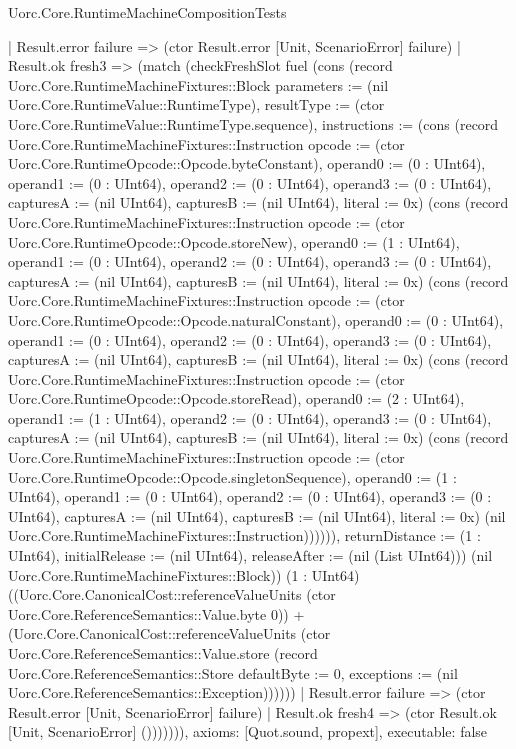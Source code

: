 \begin{lexlean}{Uorc.Core.RuntimeMachineCompositionTests}
\begin{semanticmodule}
{          | Result.error failure => (ctor Result.error [Unit, ScenarioError] failure)
          | Result.ok fresh3 => (match (checkFreshSlot fuel (cons (record Uorc.Core.RuntimeMachineFixtures::Block {parameters := (nil Uorc.Core.RuntimeValue::RuntimeType), resultType := (ctor Uorc.Core.RuntimeValue::RuntimeType.sequence), instructions := (cons (record Uorc.Core.RuntimeMachineFixtures::Instruction {opcode := (ctor Uorc.Core.RuntimeOpcode::Opcode.byteConstant), operand0 := (0 : UInt64), operand1 := (0 : UInt64), operand2 := (0 : UInt64), operand3 := (0 : UInt64), capturesA := (nil UInt64), capturesB := (nil UInt64), literal := 0x}) (cons (record Uorc.Core.RuntimeMachineFixtures::Instruction {opcode := (ctor Uorc.Core.RuntimeOpcode::Opcode.storeNew), operand0 := (1 : UInt64), operand1 := (0 : UInt64), operand2 := (0 : UInt64), operand3 := (0 : UInt64), capturesA := (nil UInt64), capturesB := (nil UInt64), literal := 0x}) (cons (record Uorc.Core.RuntimeMachineFixtures::Instruction {opcode := (ctor Uorc.Core.RuntimeOpcode::Opcode.naturalConstant), operand0 := (0 : UInt64), operand1 := (0 : UInt64), operand2 := (0 : UInt64), operand3 := (0 : UInt64), capturesA := (nil UInt64), capturesB := (nil UInt64), literal := 0x}) (cons (record Uorc.Core.RuntimeMachineFixtures::Instruction {opcode := (ctor Uorc.Core.RuntimeOpcode::Opcode.storeRead), operand0 := (2 : UInt64), operand1 := (1 : UInt64), operand2 := (0 : UInt64), operand3 := (0 : UInt64), capturesA := (nil UInt64), capturesB := (nil UInt64), literal := 0x}) (cons (record Uorc.Core.RuntimeMachineFixtures::Instruction {opcode := (ctor Uorc.Core.RuntimeOpcode::Opcode.singletonSequence), operand0 := (1 : UInt64), operand1 := (0 : UInt64), operand2 := (0 : UInt64), operand3 := (0 : UInt64), capturesA := (nil UInt64), capturesB := (nil UInt64), literal := 0x}) (nil Uorc.Core.RuntimeMachineFixtures::Instruction)))))), returnDistance := (1 : UInt64), initialRelease := (nil UInt64), releaseAfter := (nil (List UInt64))}) (nil Uorc.Core.RuntimeMachineFixtures::Block)) (1 : UInt64) ((Uorc.Core.CanonicalCost::referenceValueUnits (ctor Uorc.Core.ReferenceSemantics::Value.byte 0)) + (Uorc.Core.CanonicalCost::referenceValueUnits (ctor Uorc.Core.ReferenceSemantics::Value.store (record Uorc.Core.ReferenceSemantics::Store {defaultByte := 0, exceptions := (nil Uorc.Core.ReferenceSemantics::Exception)})))))
            | Result.error failure => (ctor Result.error [Unit, ScenarioError] failure)
            | Result.ok fresh4 => (ctor Result.ok [Unit, ScenarioError] ())))))),
  axioms: [Quot.sound, propext],
  executable: false
}


\end{semanticmodule}
\end{lexlean}
